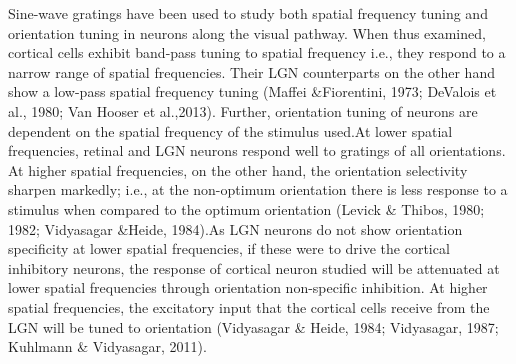 Sine-wave gratings have been used to study both spatial frequency tuning and orientation tuning in neurons along the visual pathway. When thus examined, cortical cells exhibit band-pass tuning to spatial frequency i.e., they respond to a narrow range of spatial frequencies. Their LGN counterparts on the other hand show a low-pass spatial frequency tuning (Maffei \&Fiorentini, 1973; DeValois et al., 1980; Van Hooser et al.,2013). Further, orientation tuning of neurons are dependent on the spatial frequency of the stimulus used.At lower spatial frequencies, retinal and LGN neurons respond well to gratings of all orientations. At higher spatial frequencies, on the other hand, the orientation selectivity sharpen markedly; i.e., at the non-optimum orientation there is less response to a stimulus when compared to the optimum orientation (Levick \& Thibos, 1980; 1982; Vidyasagar \&Heide, 1984).As LGN neurons do not show orientation specificity at lower spatial frequencies, if these were to drive the cortical inhibitory neurons, the response of cortical neuron studied will be attenuated at lower spatial frequencies through orientation non-specific inhibition. At higher spatial frequencies, the excitatory input that the cortical cells receive from the LGN will be tuned to orientation (Vidyasagar \& Heide, 1984; Vidyasagar, 1987; Kuhlmann \& Vidyasagar, 2011).

